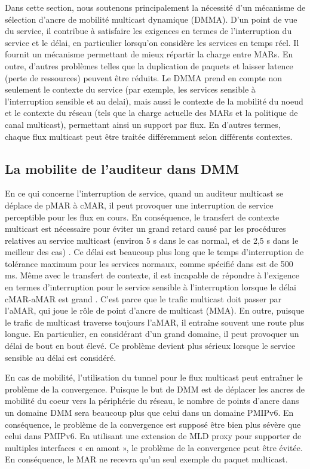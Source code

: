 Dans cette section, nous soutenons principalement la nécessité d'un mécanisme de sélection d'ancre de mobilité multicast dynamique (DMMA). D'un point de vue du service, il contribue à satisfaire les exigences en termes de l'interruption du service et le délai, en particulier lorsqu'on considère les services en temps réel. Il fournit un mécanisme permettant de mieux répartir la charge entre MARs. En outre, d'autres problèmes telles que la duplication de paquets et laisser latence (perte de ressources) peuvent être réduits. Le DMMA prend en compte non seulement le contexte du service (par exemple, les services sensible à l'interruption sensible et au delai), mais aussi le contexte de la mobilité du noeud et le contexte du réseau (tels que la charge actuelle des MARs et la politique de canal multicast), permettant ainsi un support par flux. En d'autres termes, chaque flux multicast peut être traitée différemment selon différents contextes.

\subsection{La mobilite de l'auditeur dans DMM} \label{c10:multicast_listener}

En ce qui concerne l'interruption de service, quand un auditeur multicast se déplace de pMAR à cMAR, il peut provoquer une interruption de service perceptible pour les flux en cours. En conséquence, le transfert de contexte multicast est nécessaire pour éviter un grand retard causé par les procédures relatives au service multicast (environ 5 s dans le cas normal, et de 2,5 s dans le meilleur des cas) \cite{Thinh_WCNC_Multicast}. Ce délai est beaucoup plus long que le temps d'interruption de tolérance maximum pour les services normaux, comme spécifié dans \cite{interruption_requirements} est de 500 ms. Même avec le transfert de contexte, il est incapable de répondre à l'exigence en termes d'interruption pour le service sensible à l'interruption lorsque le délai cMAR-aMAR est grand \cite{Thinh_ICNS,multicast_DMM_Sergio_PIMRC}. C'est parce que le trafic multicast doit passer par l'aMAR, qui joue le rôle de point d'ancre de multicast (MMA). En outre, puisque le trafic de multicast traverse toujours l'aMAR, il entraîne souvent une route plus longue. En particulier, en considérant d'un grand domaine, il peut provoquer un délai de bout en bout élevé. Ce problème devient plus sérieux lorsque le service sensible au délai est considéré.


En cas de mobilité, l'utilisation du tunnel pour le flux multicast peut entraîner le problème de la convergence. Puisque le but de DMM est de déplacer les ancres de mobilité du coeur vers la périphérie du réseau, le nombre de points d'ancre dans un domaine DMM sera beaucoup plus que celui dans un domaine PMIPv6. En conséquence, le problème de la convergence est supposé être bien plus sévère que celui dans PMIPv6. En utilisant une extension de MLD proxy pour supporter de multiples interfaces « en amont »\cite{multiple_upstreams}, le problème de la convergence peut être évitée. En conséquence, le MAR ne recevra qu'un seul exemple du paquet multicast.

